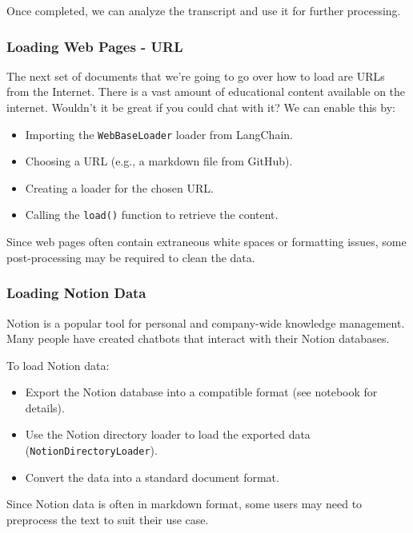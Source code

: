 \documentclass{article}
\begin{document}
Once completed, we can analyze the transcript and use it for further processing.

\subsubsection{Loading Web Pages - URL}

The next set of documents that we're going to go over how to load are URLs from the Internet. There is a vast amount of educational content available on the internet. Wouldn't it be great if you could chat with it? We can enable this by:

\begin{itemize}
    \item Importing the \texttt{WebBaseLoader} loader from LangChain.
    \item Choosing a URL (e.g., a markdown file from GitHub).
    \item Creating a loader for the chosen URL.
    \item Calling the \texttt{load()} function to retrieve the content.
\end{itemize}

Since web pages often contain extraneous white spaces or formatting issues, some post-processing may be required to clean the data.

\subsubsection{Loading Notion Data}

Notion is a popular tool for personal and company-wide knowledge management. Many people have created chatbots that interact with their Notion databases. 

To load Notion data:

\begin{itemize}
    \item Export the Notion database into a compatible format (see notebook for details).
    \item Use the Notion directory loader to load the exported data (\texttt{NotionDirectoryLoader}).
    \item Convert the data into a standard document format.
\end{itemize}

Since Notion data is often in markdown format, some users may need to preprocess the text to suit their use case.
\end{document}
